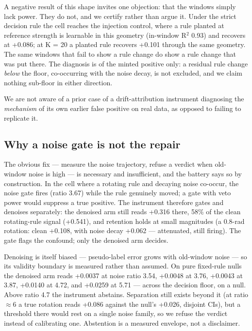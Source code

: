 \documentclass[10pt]{article} %
\begin{document}
A negative result of this shape invites one objection: that the windows simply lack power. They do
not, and we certify rather than argue it. Under the strict decision rule the cell reaches the
injection control, where a rule planted at reference strength is learnable in this geometry
(in-window R$^2$ 0.93) and recovers at +0.086; at K = 20 a planted rule recovers +0.101
through the same geometry. The same windows that fail to show a rule change do show a rule change
that was put there. The diagnosis is of the minted positive only: a residual rule change \emph{below}
the floor, co-occurring with the noise decay, is not excluded, and we claim nothing sub-floor in
either direction.

We are not aware of a prior case of a drift-attribution instrument diagnosing the \emph{mechanism} of
its own earlier false positive on real data, as opposed to failing to replicate it.

\subsection{Why a noise gate is not the repair}\label{sec:gate}

The obvious fix --- measure the noise trajectory, refuse a verdict when old-window noise is high ---
is necessary and insufficient, and the battery says so by construction. In the cell where a
rotating rule and decaying noise co-occur, the noise gate fires (ratio 3.67) while the rule
genuinely moved; a gate with veto power would suppress a true positive. The instrument therefore
gates and denoises separately: the denoised arm still reads +0.316 there, 58\% of the clean
rotating-rule signal (+0.541), and retention holds at small magnitudes (a 0.8-rad rotation: clean
+0.108, with noise decay +0.062 --- attenuated, still firing). The gate flags the confound; only the
denoised arm decides.

Denoising is itself biased --- pseudo-label error grows with old-window noise --- so its validity
boundary is measured rather than assumed. On pure fixed-rule nulls the denoised arm reads +0.0037
at noise ratio 3.54, +0.0048 at 3.76, +0.0043 at 3.87, +0.0140 at 4.72, and +0.0259 at 5.71 ---
across the decision floor, on a null. Above ratio 4.7 the instrument abstains. Separation still
exists beyond it (at ratio $\approx$6 a true rotation reads +0.086 against the null's +0.026, disjoint
CIs), but a threshold there would rest on a single noise family, so we refuse the verdict instead
of calibrating one. Abstention is a measured envelope, not a disclaimer.
\end{document}
